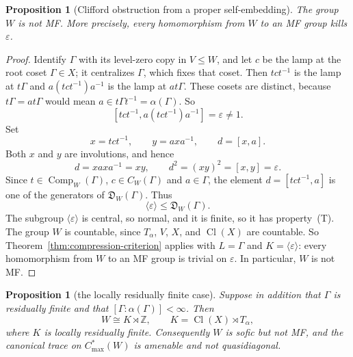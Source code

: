 \documentclass[11pt]{amsart}
\newcommand{\leanverified}[2]{\ignorespaces}
\newtheorem{proposition}[theorem]{Proposition}
\theoremstyle{plain}
\begin{document}
\begin{proposition}[Clifford obstruction from a proper self-embedding]
\label{prop:clifford-self-embedding}
The group $W$ is not MF.  More precisely, every homomorphism from $W$ to an
MF group kills $\varepsilon$.
\leanverified{Sofic/CliffordWitnessDirectDefect}{GroupApproximation.CliffordWitnessDirectDefect.manuscriptCliffordWitnessNotIsOperatorMF}
\leanverified{Sofic/CliffordWitnessDirectDefect}{GroupApproximation.CliffordWitnessDirectDefect.manuscriptMapSignEqOneOfIsOperatorMFTarget}
\end{proposition}

\begin{proof}
Identify $\Gamma$ with its level-zero copy in $V\le W$, and let $c$ be
the lamp at the root coset $\Gamma\in X$; it centralizes $\Gamma$, which
fixes that coset.  Then $tct^{-1}$ is the lamp at $t\Gamma$ and
$a(tct^{-1})a^{-1}$ is the lamp at $at\Gamma$.  These cosets are
distinct, because $t\Gamma=at\Gamma$ would mean
$a\in t\Gamma t^{-1}=\alpha(\Gamma)$.  So
\begin{equation}\label{eq:affine-clifford-sign}
 [tct^{-1},a(tct^{-1})a^{-1}]=\varepsilon\ne1.
\end{equation}
Set
\[
 x=tct^{-1},\qquad y=axa^{-1},\qquad d=[x,a].
\]
Both $x$ and $y$ are involutions, and hence
\[
 d=xaxa^{-1}=xy,
 \qquad
 d^2=(xy)^2=[x,y]=\varepsilon.
\]
Since $t\in\operatorname{Comp}_W(\Gamma)$, $c\in C_W(\Gamma)$ and
$a\in\Gamma$, the element $d=[tct^{-1},a]$ is one of the generators of
$\mathfrak D_W(\Gamma)$.  Thus
\[
 \langle\varepsilon\rangle\leq\mathfrak D_W(\Gamma).
\]
The subgroup $\langle\varepsilon\rangle$ is central, so normal, and it
is finite, so it has property~\textup{(T)}.  The group $W$ is countable,
since $T_\alpha$, $V$, $X$, and $\operatorname{Cl}(X)$ are countable.
So Theorem~\ref{thm:compression-criterion} applies with $L=\Gamma$ and
$K=\langle\varepsilon\rangle$: every homomorphism from $W$ to an MF
group is trivial on $\varepsilon$.  In particular, $W$ is not MF\@.
\end{proof}

\begin{proposition}[the locally residually finite case]
\label{prop:clifford-locally-rf}
Suppose in addition that $\Gamma$ is residually finite and that
$[\Gamma:\alpha(\Gamma)]<\infty$.  Then
\[
 W\cong K\rtimes\mathbb Z,
 \qquad K=\operatorname{Cl}(X)\rtimes T_\alpha,
\]
where $K$ is locally residually finite.  Consequently $W$ is sofic but not
MF, and the canonical trace on
$C^*_{\max}(W)$ is amenable and not quasidiagonal.
\end{proposition}
\end{document}
